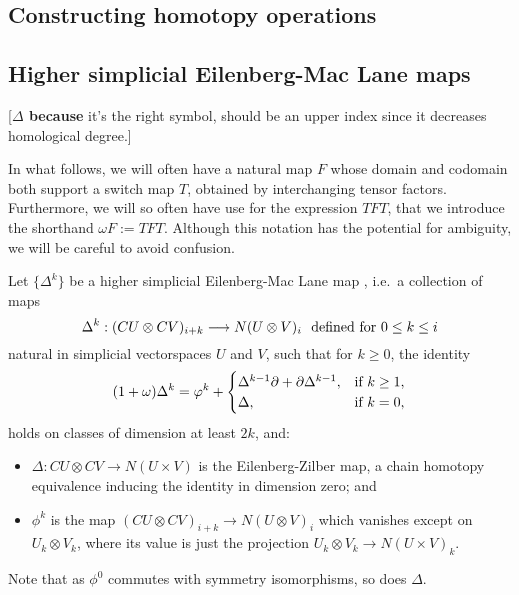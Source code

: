 \documentclass[11pt]{amsart}
\theoremstyle{plain}
\theoremstyle{definition}
\let\oldphi\phi
\let\phi\varphi
\renewcommand{\to}{\longrightarrow}
\theoremstyle{plain}
\newcommand{\twist}{\omega}
\newcommand{\DeltaUp}{\Delta}%
\begin{document}
\begin{Constructing homotopy and cohomotopy operations}
\vfil\pagebreak


\section{\textbf{Constructing homotopy operations}}\label{sec:Constructing homotopy operations}

\subsection{Higher simplicial Eilenberg-Mac Lane maps}[\textbf{$\Delta$ because} it's the right symbol, should be an upper index since it decreases homological degree.]


In what follows, we will often have a natural map $F$ whose domain and codomain both support a switch map $T$, obtained by interchanging tensor factors. Furthermore, we will so often have use for the expression $TFT$, that we introduce the shorthand $\twist F:=TFT$. Although this notation has the potential for ambiguity, we will be careful to avoid confusion.

Let $\{\DeltaUp^k\}$ be a higher simplicial Eilenberg-Mac Lane map \cite[\S3]{DwyerHtpyOpsSimpComAlg.pdf}, i.e.\ a collection of maps
\[\DeltaUp^k:(CU\otimes CV)_{i+k}\to N(U\otimes V)_i\textup{\ \ defined for $0\leq k\leq i$}\]
natural in simplicial vectorspaces $U$ and $V$, such that for $k\geq0$, the identity
\[(1+\twist) \DeltaUp^k=\oldphi^k+\begin{cases}
\DeltaUp^{k-1}\partial+\partial\DeltaUp^{k-1},&\textup{if }k\geq1,\\
\Delta,&\textup{if }k=0,
\end{cases}
\]
holds on classes of dimension at least $2k$, and:
\begin{itemize}
\setlength{\parindent}{.25in}
\item $\Delta:CU\otimes CV\to N(U\times V)$ is the Eilenberg-Zilber map, a chain homotopy equivalence inducing the identity in dimension zero; and
\item $\oldphi^k$ is the map $(CU\otimes CV)_{i+k}\to N(U\otimes V)_i$ which vanishes except on $U_k\otimes V_k$, where its value is just the projection $U_k\otimes V_k\to N(U\times V)_k$.
\end{itemize}
Note that as $\oldphi^0$ commutes with symmetry isomorphisms, so does $\Delta$.






\end{Constructing homotopy and cohomotopy operations}
\end{document}
